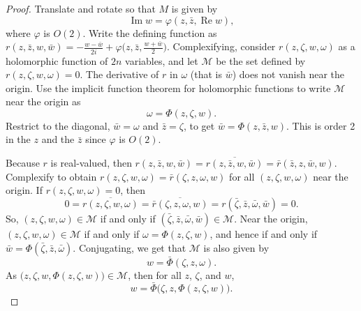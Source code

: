 \documentclass[12pt,openany]{book}
\renewcommand{\Re}{\operatorname{Re}}
\renewcommand{\Im}{\operatorname{Im}}
\newcommand{\sM}{{\mathscr{M}}}
\theoremstyle{plain}
\theoremstyle{remark}
\theoremstyle{definition}
\theoremstyle{exercise}
\theoremstyle{example}
\begin{document}
\begin{proof}
Translate and rotate so that $M$ is given by
\begin{equation*}
\Im w = \varphi(z,\bar{z},\Re w) ,
\end{equation*}
where $\varphi$ is $O(2)$.
Write the defining function
as $r(z,\bar{z},w,\bar{w}) = -\frac{w-\bar{w}}{2i}
+\varphi\bigl(z,\bar{z},\frac{w+\bar{w}}{2}\bigr)$.
Complexifying, consider
$r(z,\zeta,w,\omega)$ as
a holomorphic function of $2n$ variables,
and let $\sM$ be the set defined by
$r(z,\zeta,w,\omega) = 0$.
The derivative of $r$ in
$\omega$ (that is $\bar{w}$) does not vanish near the origin.
Use the implicit function theorem for holomorphic functions to write $\sM$
near the origin as
\begin{equation*}
\omega = \Phi(z,\zeta,w) .
\end{equation*}
Restrict to the diagonal, $\bar{w} = \omega$ and $\bar{z}=\zeta$,
to get
$\bar{w} = \Phi(z,\bar{z},w)$.  This is order 2 in the $z$ and the $\bar{z}$
since $\varphi$ is $O(2)$.

Because $r$ is real-valued, then
$r(z,\bar{z},w,\bar{w}) =
\overline{r(z,\bar{z},w,\bar{w})} = \bar{r}(\bar{z},z,\bar{w},w)$.
Complexify to obtain
$r(z,\zeta,w,\omega) =
\bar{r}(\zeta,z,\omega,w)$ for all $(z,\zeta,w,\omega)$ near the origin.
If $r(z,\zeta,w,\omega) = 0$,
then
\begin{equation*}
0 = \overline{r(z,\zeta,w,\omega)} =
\overline{\bar{r}(\zeta,z,\omega,w)} =
r(\bar{\zeta},\bar{z},\bar{\omega},\bar{w}) =0.
\end{equation*}
So,
$(z,\zeta,w,\omega) \in \sM$
if and only if
$(\bar{\zeta},\bar{z},\bar{\omega},\bar{w}) \in \sM$.
Near the origin,
$(z,\zeta,w,\omega) \in \sM$ if and only if
$\omega = \Phi(z,\zeta,w)$, and hence
if and only if
$\bar{w} = \Phi(\bar{\zeta},\bar{z},\bar{\omega})$.
Conjugating, we get that $\sM$ is also given by
\begin{equation*}
w = \bar{\Phi}(\zeta,z,\omega).
\end{equation*}
As $\bigl(z,\zeta,w,\Phi(z,\zeta,w)\bigr) \in \sM$, then
for all $z$, $\zeta$, and $w$,
\begin{equation*}
w = \bar{\Phi}\bigl(\zeta,z,\Phi(z,\zeta,w)\bigr).
\end{equation*}


\end{proof}
\end{document}
